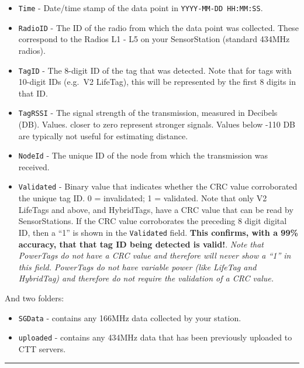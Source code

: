 \documentclass[
]{article}
\providecommand{\tightlist}{%
  \setlength{\itemsep}{0pt}\setlength{\parskip}{0pt}}
\begin{document}
\begin{itemize}
  \begin{itemize}
  \tightlist
  \item
    \texttt{Time} - Date/time stamp of the data point in
    \texttt{YYYY-MM-DD\ HH:MM:SS}.
  \item
    \texttt{RadioID} - The ID of the radio from which the data point was
    collected. These correspond to the Radios L1 - L5 on your
    SensorStation (standard 434MHz radios).
  \item
    \texttt{TagID} - The 8-digit ID of the tag that was detected. Note
    that for tags with 10-digit IDs (e.g.~V2 LifeTag), this will be
    represented by the first 8 digits in that ID.
  \item
    \texttt{TagRSSI} - The signal strength of the transmission, measured
    in Decibels (DB). Values. closer to zero represent stronger signals.
    Values below -110 DB are typically not useful for estimating
    distance.
  \item
    \texttt{NodeId} - The unique ID of the node from which the
    transmission was received.
  \item
    \texttt{Validated} - Binary value that indicates whether the CRC
    value corroborated the unique tag ID. 0 = invalidated; 1 =
    validated. Note that only V2 LifeTags and above, and HybridTags,
    have a CRC value that can be read by SensorStations. If the CRC
    value corroborates the preceding 8 digit digital ID, then a ``1'' is
    shown in the \texttt{Validated} field. \textbf{This confirms, with a
    99\% accuracy, that that tag ID being detected is valid!}.
    \emph{Note that PowerTags do not have a CRC value and therefore will
    never show a ``1'' in this field. PowerTags do not have variable
    power (like LifeTag and HybridTag) and therefore do not require the
    validation of a CRC value.}
  \end{itemize}
\end{itemize}

And two folders:

\begin{itemize}
\tightlist
\item
  \texttt{SGData} - contains any 166MHz data collected by your station.
\item
  \texttt{uploaded} - contains any 434MHz data that has been previously
  uploaded to CTT servers.
\end{itemize}

\begin{center}\rule{0.5\linewidth}{0.5pt}\end{center}
\end{document}

